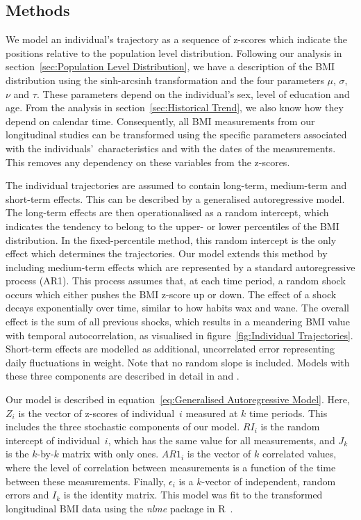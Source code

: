 \documentclass{imammb}
\numberwithin{equation}{section}
\begin{document}
\subsection{Methods}
\label{sec:Individual Trajectories/Methods}

We model an individual's trajectory as a sequence of z-scores which indicate the positions relative to the population level distribution. Following our analysis in section~\ref{sec:Population Level Distribution}, we have a description of the BMI distribution using the sinh-arcsinh transformation and the four parameters $\mu$, $\sigma$, $\nu$ and $\tau$. These \mbox{parameters} depend on the individual's sex, level of education and age. From the analysis in section~\ref{sec:Historical Trend}, we also know how they depend on calendar time. Consequently, all BMI measurements from our longitudinal studies can be transformed using the specific parameters associated with the individuals'~characteristics and with the dates of the measurements. This removes any dependency on these variables from the z-scores.

The individual trajectories are assumed to contain long-term, medium-term and short-term effects. This can be described by a generalised autoregressive model. The long-term effects are then operationalised as a random intercept, which indicates the tendency to belong to the upper- or lower percentiles of the BMI distribution. In the fixed-percentile method, this random intercept is the only effect which determines the trajectories. Our model extends this method by including medium-term effects which are represented by a standard autoregressive process (AR1). This process assumes that, at each time period, a random shock occurs which either pushes the BMI z-score up or down. The effect of a shock decays exponentially over time, similar to how habits wax and wane. The overall effect is the sum of all previous shocks, which results in a meandering BMI value with temporal autocorrelation, as visualised in figure~\ref{fig:Individual Trajectories}. Short-term effects are modelled as additional, uncorrelated error representing daily fluctuations in weight. Note that no random slope is included. Models with these three components are described in detail in \cite{Diggle1988, Diggle1994} and \cite{Verbeke2000}.

Our model is described in equation~\ref{eq:Generalised Autoregressive Model}. Here, $Z_{i}$ is the vector of z-scores of individual~$i$ measured at $k$ time periods. This includes the three stochastic components of our model. $RI_i$ is the random intercept of individual~$i$, which has the same value for all measurements, and $J_k$ is the $k$-by-$k$ matrix with only ones. $AR1_i$ is the vector of $k$ correlated values, where the level of correlation between measurements is a function of the time between these measurements. Finally, $\epsilon_{i}$ is a $k$-vector of independent, random errors and $I_k$ is the identity matrix. This model was fit to the transformed longitudinal BMI data using the \textit{nlme} package in R~\citep{nlme2021, R2021}.
\end{document}
